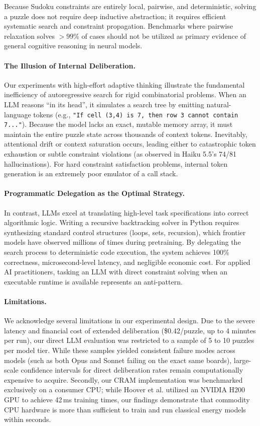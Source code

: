 \documentclass{article} %
\begin{document}
Because Sudoku constraints are entirely local, pairwise, and deterministic, solving a puzzle does not require deep inductive abstraction; it requires efficient systematic search and constraint propagation. Benchmarks where pairwise relaxation solves $>99\%$ of cases should not be utilized as primary evidence of general cognitive reasoning in neural models.

\paragraph{The Illusion of Internal Deliberation.}
Our experiments with high-effort adaptive thinking illustrate the fundamental inefficiency of autoregressive search for rigid combinatorial problems. When an LLM reasons ``in its head'', it simulates a search tree by emitting natural-language tokens (e.g., \texttt{"If cell (3,4) is 7, then row 3 cannot contain 7..."}). Because the model lacks an exact, mutable memory array, it must maintain the entire puzzle state across thousands of context tokens. Inevitably, attentional drift or context saturation occurs, leading either to catastrophic token exhaustion or subtle constraint violations (as observed in Haiku 5.5's 74/81 hallucinations). For hard constraint satisfaction problems, internal token generation is an extremely poor emulator of a call stack.

\paragraph{Programmatic Delegation as the Optimal Strategy.}
In contrast, LLMs excel at translating high-level task specifications into correct algorithmic logic. Writing a recursive backtracking solver in Python requires synthesizing standard control structures (loops, sets, recursion), which frontier models have observed millions of times during pretraining. By delegating the search process to deterministic code execution, the system achieves 100\% correctness, microsecond-level latency, and negligible economic cost. For applied AI practitioners, tasking an LLM with direct constraint solving when an executable runtime is available represents an anti-pattern.

\paragraph{Limitations.}
We acknowledge several limitations in our experimental design. Due to the severe latency and financial cost of extended deliberation (\$0.42/puzzle, up to 4 minutes per run), our direct LLM evaluation was restricted to a sample of 5 to 10 puzzles per model tier. While these samples yielded consistent failure modes across models (such as both Opus and Sonnet failing on the exact same boards), large-scale confidence intervals for direct deliberation rates remain computationally expensive to acquire. Secondly, our CRAM implementation was benchmarked exclusively on a consumer CPU; while Hoover et al. utilized an NVIDIA H200 GPU to achieve 42\,ms training times, our findings demonstrate that commodity CPU hardware is more than sufficient to train and run classical energy models within seconds.
\end{document}
